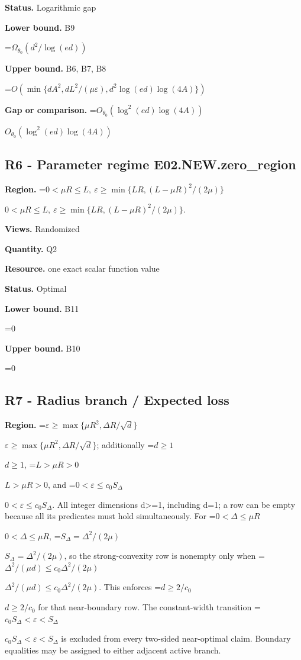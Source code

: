 \documentclass[10pt,a4paper]{article}
\newcommand{\AtlasMath}[1]{\par\begingroup\centering\setbox0=\hbox{$\displaystyle #1$}\ifdim\wd0>1.4\linewidth\typeout{ATLAS WIDE FORMULA: \the\wd0}\fi\ifdim\wd0>\linewidth\resizebox{\linewidth}{!}{\box0}\else\box0\fi\par\endgroup}
\newcommand{\AtlasInlineMath}[1]{\begingroup\setbox0=\hbox{$#1$}\ifdim\wd0>.4\linewidth\endgroup\AtlasMath{#1}\else\endgroup$#1$\fi}
\begin{document}
\textbf{Status.} Logarithmic gap



\textbf{Lower bound.} B9



\AtlasMath{\Omega_{\theta_0}(d^2/\log(ed))}


\textbf{Upper bound.} B6, B7, B8



\AtlasMath{O(\min\{dA^2,dL^2/(\mu\varepsilon),d^2\log(ed)\log(4A)\})}


\textbf{Gap or comparison.} \AtlasInlineMath{O_{\theta_0}(\log^2(ed)\log(4A))}



\subsection{R6 - Parameter regime E02.NEW.zero\_region}


\textbf{Region.} \AtlasInlineMath{0<\mu R\le L,\ \varepsilon\ge\min\{LR,(L-\mu R)^2/(2\mu)\}}.



\textbf{Views.} Randomized



\textbf{Quantity.} Q2



\textbf{Resource.} one exact scalar function value



\textbf{Status.} Optimal



\textbf{Lower bound.} B11



\AtlasMath{0}


\textbf{Upper bound.} B10



\AtlasMath{0}


\subsection{R7 - Radius branch / Expected loss}


\textbf{Region.} \AtlasInlineMath{\varepsilon\ge\max\{\mu R^2,\Delta R/\sqrt d\}}; additionally \AtlasInlineMath{d\ge1}, \AtlasInlineMath{L>\mu R>0}, and \AtlasInlineMath{0<\varepsilon\le c_0S_\Delta}. All integer dimensions d>=1, including d=1; a row can be empty because all its predicates must hold simultaneously. For \AtlasInlineMath{0<\Delta\le\mu R}, \AtlasInlineMath{S_\Delta=\Delta^2/(2\mu)}, so the strong-convexity row is nonempty only when \AtlasInlineMath{\Delta^2/(\mu d)\le c_0\Delta^2/(2\mu)}. This enforces \AtlasInlineMath{d\ge2/c_0} for that near-boundary row. The constant-width transition \AtlasInlineMath{c_0S_\Delta<\varepsilon<S_\Delta} is excluded from every two-sided near-optimal claim. Boundary equalities may be assigned to either adjacent active branch.
\end{document}

